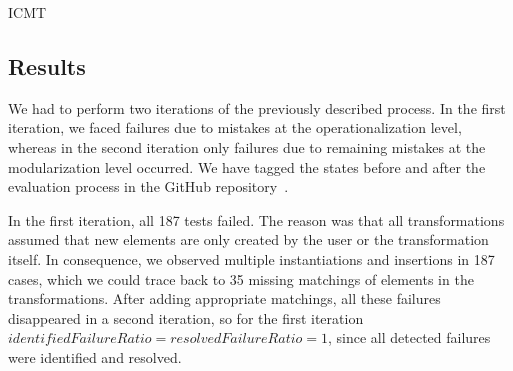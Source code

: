 \begin{copiedFrom}{ICMT}


\subsection{Results}

We had to perform two iterations of the previously described process.
In the first iteration, we faced failures due to mistakes at the operationalization level, whereas in the second iteration only failures due to remaining mistakes at the modularization level occurred.
We have tagged the states before and after the evaluation process in the GitHub repository~\cite{vitruvCBSEGithub}.


In the first iteration, all 187 tests failed.
The reason was that all transformations assumed that new elements are only created by the user or the transformation itself.
In consequence, we observed multiple instantiations and insertions in 187 cases, which we could trace back to 35 missing matchings of elements in the transformations.
After adding appropriate matchings, all these failures disappeared in a second iteration, so for the first iteration $\mathit{identifiedFailureRatio = resolvedFailureRatio = 1}$, since all detected failures were identified and resolved.


\end{copiedFrom}
